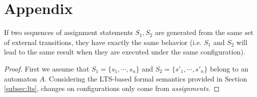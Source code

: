 \section*{Appendix}

\setcounter{theorem}{0}
\begin{theorem} If two sequences of assignment statements $S_1, S_2$ are generated from the same set of external transitions, they have exactly the same behavior (i.e. $S_1$ and $S_2$ will lead to the same result when they are executed under the same configuration).
\end{theorem}
\begin{proof}
    First we assume that $S_1=\{s_1,\cdots,s_n\}$ and $S_2=\{s'_1,\cdots,s'_n\}$ belong to an automaton $A$.
    Considering the LTS-based formal semantics provided in Section \ref{subsec:lts}, changes on configurations only come from \emph{assignments}. 
    
    

\end{proof}
